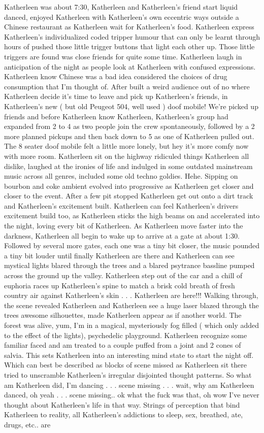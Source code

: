 \documentclass[12pt]{book}
\begin{document}
Katherleen was about 7:30, Katherleen and Katherleen's friend start liquid danced, enjoyed Katherleen with Katherleen's own eccentric ways outside a Chinese restaurant as Katherleen wait for Katherleen's food. Katherleen express Katherleen's individualized coded tripper humour that can only be learnt through hours of pushed those little trigger buttons that light each other up. Those little triggers are found was close friends for quite some time. Katherleen laugh in anticipation of the night as people look at Katherleen with confused expressions. Katherleen know Chinese was a bad idea considered the choices of drug consumption that I'm thought of. After built a weird audience out of no where Katherleen decide it's time to leave and pick up Katherleen's friends, in Katherleen's new ( but old Peugeot 504, well used ) doof mobile! We're picked up friends and before Katherleen know Katherleen, Katherleen's group had expanded from 2 to 4 as two people join the crew spontaneously, followed by a 2 more planned pickups and then back down to 5 as one of Katherleen pulled out. The 8 seater doof mobile felt a little more lonely, but hey it's more comfy now with more room. Katherleen sit on the highway ridiculed things Katherleen all dislike, laughed at the ironies of life and indulged in some outdated mainstream music across all genres, included some old techno goldies. Hehe. Sipping on bourbon and coke ambient evolved into progressive as Katherleen get closer and closer to the event. After a few pit stopped Katherleen get out onto a dirt track and Katherleen's excitement built. Katherleen can feel Katherleen's drivers excitement build too, as Katherleen sticks the high beams on and accelerated into the night, loving every bit of Katherleen. As Katherleen move faster into the darkness, Katherleen all begin to wake up to arrive at a gate at about 1:30. Followed by several more gates, each one was a tiny bit closer, the music pounded a tiny bit louder until finally Katherleen are there and Katherleen can see mystical lights blared through the trees and a blared psytrance bassline pumped across the ground up the valley. Katherleen step out of the car and a chill of euphoria races up Katherleen's spine to match a brisk cold breath of fresh country air against Katherleen's skin . . .  Katherleen are here!!! Walking through, the scene revealed Katherleen and Katherleen see a huge laser blazed through the trees  awesome silhouettes, made Katherleen appear as if another world. The forest was alive, yum, I'm in a magical, mysteriously fog filled ( which only added to the effect of the lights), psychedelic playground. Katherleen recognize some familiar faced and am treated to a couple puffed from a joint and 2 cones of salvia. This sets Katherleen into an interesting mind state to start the night off. Which can best be described as blocks of scene missed as Katherleen sit there tried to unscramble Katherleen's irregular disjointed thought patterns. So what am Katherleen did, I'm dancing . . .  scene missing . . .  wait, why am Katherleen danced, oh yeah . . .  scene missing.. ok what the fuck was that, oh wow I've never thought about Katherleen's life in that way. Strings of perception that bind Katherleen to reality, all Katherleen's addictions to sleep, sex, breathed, ate, drugs, etc.. are 
\end{document}
